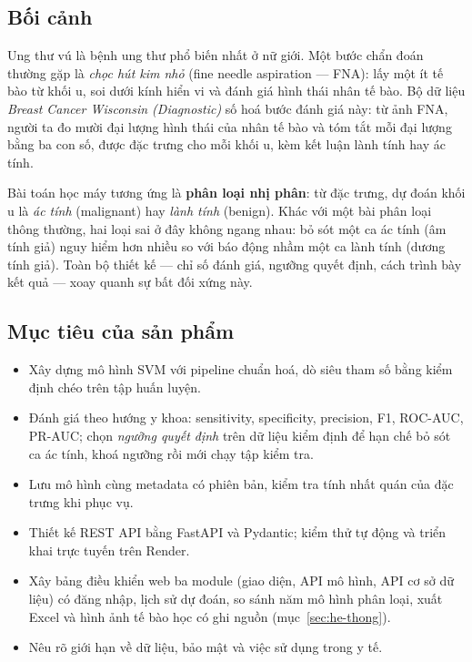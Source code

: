 \documentclass[12pt]{article}
\begin{document}
\subsection{Bối cảnh}
Ung thư vú là bệnh ung thư phổ biến nhất ở nữ giới. Một bước chẩn đoán thường gặp là \emph{chọc hút kim nhỏ}
(fine needle aspiration --- FNA): lấy một ít tế bào từ khối u, soi dưới kính hiển vi và đánh giá hình thái nhân tế
bào. Bộ dữ liệu \emph{Breast Cancer Wisconsin (Diagnostic)} số hoá bước đánh giá này: từ ảnh FNA, người ta đo mười
đại lượng hình thái của nhân tế bào và tóm tắt mỗi đại lượng bằng ba con số, được \NFeatures{} đặc trưng cho mỗi khối
u, kèm kết luận lành tính hay ác tính.

Bài toán học máy tương ứng là \textbf{phân loại nhị phân}: từ \NFeatures{} đặc trưng, dự đoán khối u là
\emph{ác tính} (malignant) hay \emph{lành tính} (benign). Khác với một bài phân loại thông thường, hai loại sai
ở đây không ngang nhau: bỏ sót một ca ác tính (âm tính giả) nguy hiểm hơn nhiều so với báo động nhầm một ca lành
tính (dương tính giả). Toàn bộ thiết kế --- chỉ số đánh giá, ngưỡng quyết định, cách trình bày kết quả --- xoay
quanh sự bất đối xứng này.

\subsection{Mục tiêu của sản phẩm}
\begin{itemize}
  \item Xây dựng mô hình SVM với pipeline chuẩn hoá, dò siêu tham số bằng kiểm định chéo trên tập huấn luyện.
  \item Đánh giá theo hướng y khoa: sensitivity, specificity, precision, F1, ROC-AUC, PR-AUC; chọn \emph{ngưỡng
        quyết định} trên dữ liệu kiểm định để hạn chế bỏ sót ca ác tính, khoá ngưỡng rồi mới chạy tập kiểm tra.
  \item Lưu mô hình cùng metadata có phiên bản, kiểm tra tính nhất quán của đặc trưng khi phục vụ.
  \item Thiết kế REST API bằng FastAPI và Pydantic; kiểm thử tự động và triển khai trực tuyến trên Render.
  \item Xây bảng điều khiển web ba module (giao diện, API mô hình, API cơ sở dữ liệu) có đăng nhập, lịch sử dự đoán,
        so sánh năm mô hình phân loại, xuất Excel và hình ảnh tế bào học có ghi nguồn (mục~\ref{sec:he-thong}).
  \item Nêu rõ giới hạn về dữ liệu, bảo mật và việc sử dụng trong y tế.
\end{itemize}
\end{document}
